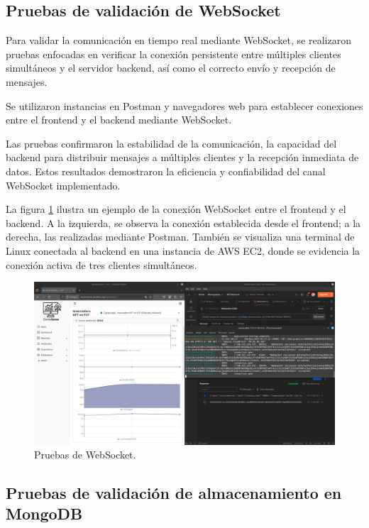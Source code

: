 \subsection{Pruebas de validación de WebSocket}

Para validar la comunicación en tiempo real mediante WebSocket, se realizaron
pruebas enfocadas en verificar la conexión persistente entre múltiples clientes
simultáneos y el servidor backend, así como el correcto envío y recepción de
mensajes.

Se utilizaron instancias en Postman y navegadores web para establecer
conexiones entre el frontend y el backend mediante WebSocket.

Las pruebas confirmaron la estabilidad de la comunicación, la capacidad del
backend para distribuir mensajes a múltiples clientes y la recepción inmediata
de datos. Estos resultados demostraron la eficiencia y confiabilidad del canal
WebSocket implementado.

La figura \ref{fig:websocket} ilustra un ejemplo de la conexión WebSocket entre
el frontend y el backend. A la izquierda, se observa la conexión establecida
desde el frontend; a la derecha, las realizadas mediante Postman. También se
visualiza una terminal de Linux conectada al backend en una instancia de AWS
EC2, donde se evidencia la conexión activa de tres clientes simultáneos.

\begin{figure}[H]
    \centering
    \includegraphics[width=\textwidth]{Images/40_websocket.png}
    \caption[Pruebas de WebSocket]{Pruebas de WebSocket.}
    \label{fig:websocket}
\end{figure}

\subsection{Pruebas de validación de almacenamiento en MongoDB}

